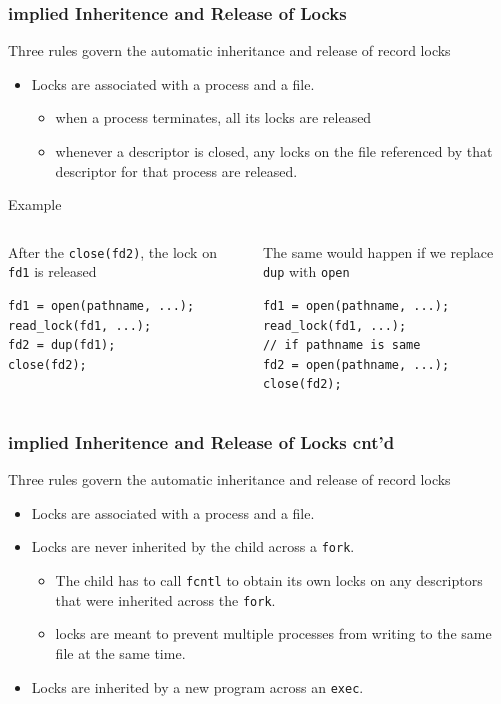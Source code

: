 \documentclass[newPxFont,sthlmFooter,nooffset]{beamer}
\begin{document}
\begin{frame}[fragile,t]
  \frametitle{implied Inheritence and Release of Locks}
Three rules govern the automatic inheritance and release of record locks  
\begin{itemize}
  \item Locks are associated with a process and a file. 
    \begin{itemize}
    \item when a process terminates, all its locks are released
    \item whenever a descriptor is closed, any locks on the file referenced by that descriptor for that process are released.
    \end{itemize}
\end{itemize}

\bigskip
Example

{\footnotesize
\begin{columns}[t]
  \begin{column}{0.5\textwidth}
After the \texttt{close(fd2)}, the lock on \texttt{fd1} is released
\begin{verbatim}
fd1 = open(pathname, ...);
read_lock(fd1, ...);
fd2 = dup(fd1);
close(fd2);
\end{verbatim}
  \end{column}
  \begin{column}{0.5\textwidth}
The same would happen if we replace \texttt{dup} with \texttt{open}
\begin{verbatim}
fd1 = open(pathname, ...);
read_lock(fd1, ...);
// if pathname is same
fd2 = open(pathname, ...); 
close(fd2);
\end{verbatim}    
  \end{column}
\end{columns}
}
\end{frame}


\begin{frame}[t]
  \frametitle{implied Inheritence and Release of Locks cnt'd}
Three rules govern the automatic inheritance and release of record locks  
\begin{itemize}
  \item Locks are associated with a process and a file.
  \item Locks are never inherited by the child across a \texttt{fork}.
    \begin{itemize}
    \item The child has to call \texttt{fcntl} to obtain its own locks on any
      descriptors that were inherited across the \texttt{fork}.
    \item locks are meant to prevent multiple
      processes from writing to the same file at the same time. 
    \end{itemize}

  \item Locks are inherited by a new program across an \texttt{exec}.
\end{itemize}
  
\end{frame}
\end{document}
